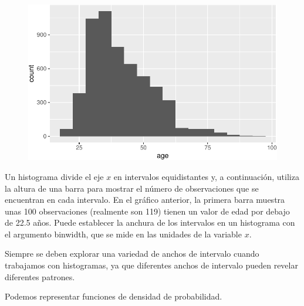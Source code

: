 \documentclass[
  letterpaper,
  DIV=11,
  numbers=noendperiod]{scrreprt}
\begin{document}
\begin{figure}[H]

{\centering \includegraphics{eda_files/figure-pdf/unnamed-chunk-10-1.pdf}

}

\end{figure}

Un histograma divide el eje \(x\) en intervalos equidistantes y, a
continuación, utiliza la altura de una barra para mostrar el número de
observaciones que se encuentran en cada intervalo. En el gráfico
anterior, la primera barra muestra unas 100 observaciones (realmente son
119) tienen un valor de edad por debajo de 22.5 años. Puede establecer
la anchura de los intervalos en un histograma con el argumento binwidth,
que se mide en las unidades de la variable \(x\).

\begin{tcolorbox}[enhanced jigsaw, arc=.35mm, breakable, coltitle=black, left=2mm, opacityback=0, bottomtitle=1mm, colbacktitle=quarto-callout-important-color!10!white, title=\textcolor{quarto-callout-important-color}{\faExclamation}\hspace{0.5em}{Para recordar}, titlerule=0mm, colback=white, colframe=quarto-callout-important-color-frame, bottomrule=.15mm, rightrule=.15mm, opacitybacktitle=0.6, toptitle=1mm, toprule=.15mm, leftrule=.75mm]

Siempre se deben explorar una variedad de anchos de intervalo cuando
trabajamos con histogramas, ya que diferentes anchos de intervalo pueden
revelar diferentes patrones.

\end{tcolorbox}

Podemos representar funciones de densidad de probabilidad.
\end{document}

